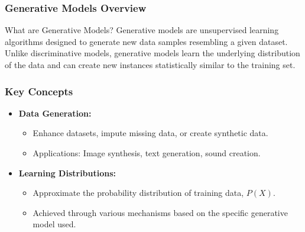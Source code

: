 \documentclass[aspectratio=169]{beamer}
\begin{document}
\begin{frame}[fragile]
    \frametitle{Generative Models Overview}
    \begin{block}{What are Generative Models?}
        Generative models are unsupervised learning algorithms designed to generate new data samples resembling a given dataset.
        Unlike discriminative models, generative models learn the underlying distribution of the data and can create new instances statistically similar to the training set.
    \end{block}
\end{frame}

\begin{frame}[fragile]
    \frametitle{Key Concepts}
    \begin{itemize}
        \item \textbf{Data Generation:} 
            \begin{itemize}
                \item Enhance datasets, impute missing data, or create synthetic data.
                \item Applications: Image synthesis, text generation, sound creation.
            \end{itemize}
        \item \textbf{Learning Distributions:} 
            \begin{itemize}
                \item Approximate the probability distribution of training data, $P(X)$.
                \item Achieved through various mechanisms based on the specific generative model used.
            \end{itemize}
    \end{itemize}
\end{frame}
\end{document}
